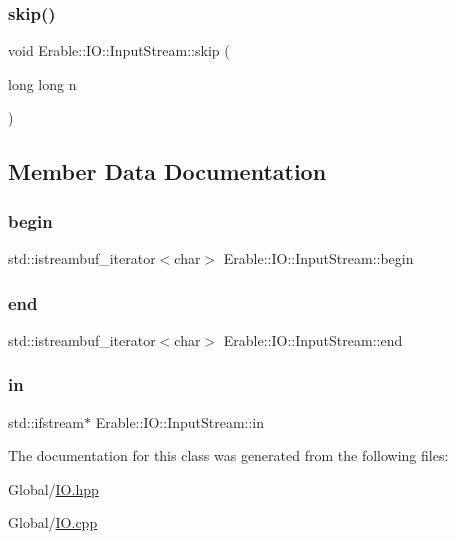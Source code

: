 \subsubsection{\texorpdfstring{skip()}{skip()}}
{\footnotesize\ttfamily void Erable\+::\+I\+O\+::\+Input\+Stream\+::skip (\begin{DoxyParamCaption}\item[{long long}]{n }\end{DoxyParamCaption})}



\subsection{Member Data Documentation}
\mbox{\label{class_erable_1_1_i_o_1_1_input_stream_ae5ef880f2573b7d486c72007c85bb759}} 
\subsubsection{\texorpdfstring{begin}{begin}}
{\footnotesize\ttfamily std\+::istreambuf\+\_\+iterator$<$char$>$ Erable\+::\+I\+O\+::\+Input\+Stream\+::begin\hspace{0.3cm}{\ttfamily [private]}}

\mbox{\label{class_erable_1_1_i_o_1_1_input_stream_aa65bd60380fa5a413f8a7689ee86f2f9}} 
\subsubsection{\texorpdfstring{end}{end}}
{\footnotesize\ttfamily std\+::istreambuf\+\_\+iterator$<$char$>$ Erable\+::\+I\+O\+::\+Input\+Stream\+::end\hspace{0.3cm}{\ttfamily [private]}}

\mbox{\label{class_erable_1_1_i_o_1_1_input_stream_a6971259f7e4a52a38e6f999419c95588}} 
\subsubsection{\texorpdfstring{in}{in}}
{\footnotesize\ttfamily std\+::ifstream$\ast$ Erable\+::\+I\+O\+::\+Input\+Stream\+::in\hspace{0.3cm}{\ttfamily [private]}}



The documentation for this class was generated from the following files\+:\begin{DoxyCompactItemize}
\item 
Global/\mbox{\hyperlink{_i_o_8hpp}{I\+O.\+hpp}}\item 
Global/\mbox{\hyperlink{_i_o_8cpp}{I\+O.\+cpp}}\end{DoxyCompactItemize}

